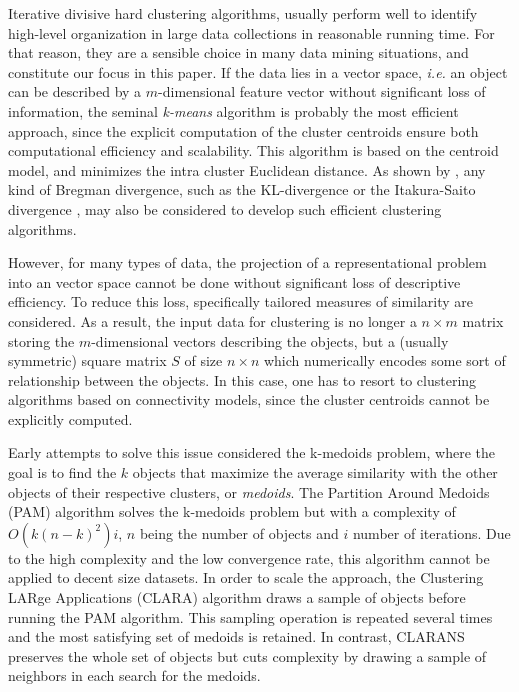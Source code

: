 \documentclass[10pt,letterpaper]{article}
\begin{document}
Iterative divisive hard clustering algorithms, usually perform well to identify high-level organization in large data collections in reasonable running time. For that reason, they are a sensible choice in many data mining situations, and constitute our focus in this paper.
If the data lies in a vector space, \textit{i.e.} an object can be described by a $m$-dimensional feature vector without significant loss of information, the seminal \emph{k-means} algorithm \cite{macQueenBsmsp67} is probably the most efficient approach, since the explicit computation of the cluster centroids ensure both computational efficiency and scalability. This algorithm is  based on the centroid model, and minimizes the intra cluster Euclidean distance. As shown by \cite{Banerjee:2005:CBD:1046920.1194902}, any kind of Bregman divergence, such as the KL-divergence \cite{Dhillon:2003:DIT:944919.944973} or the Itakura-Saito divergence \cite{linde:algorithm}, may also be considered to develop such efficient clustering algorithms.

However, for many types of data, the projection of a representational problem into an vector space cannot be done without significant loss of descriptive efficiency. To reduce this loss, specifically tailored measures of similarity are considered. As a result, the input data for clustering is no longer a $n \times m$ matrix storing the $m$-dimensional vectors describing the objects, but a (usually symmetric) square matrix $S$ of size $n \times n$ which numerically encodes some sort of relationship between the objects. In this case, one has to resort to clustering algorithms based on connectivity models, since the cluster centroids cannot be explicitly computed.

Early attempts to solve this issue considered the k-medoids problem, where the goal is to find the $k$ objects that maximize the average similarity with the other objects of their respective clusters, or \emph{medoids}. The Partition Around Medoids (PAM) algorithm \cite{KaufmanRousseeuw90} solves the k-medoids problem but with a complexity of $O(k(n-k)^2)i$, $n$ being the number of objects and $i$ number of iterations. Due to the high complexity and the low convergence rate, this algorithm cannot be applied to decent size datasets. In order to scale the approach, the Clustering LARge Applications (CLARA) algorithm \cite{KaufmanRousseeuw90} draws a sample of objects before running the PAM algorithm. This sampling operation is repeated several times and the most satisfying set of medoids is retained. In contrast, CLARANS \cite{Ng:1994:EEC:645920.672827} preserves the whole set of objects but cuts complexity by  drawing a sample of neighbors in each search for the medoids.
\end{document}
